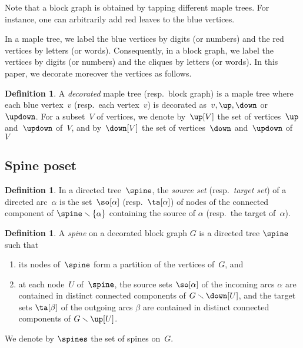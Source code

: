 \documentclass{amsart}
\theoremstyle{definition}
\newtheorem{definition}[theorem]{Definition}
\newcommand{\ssm}{\smallsetminus} %
\newcommand{\darkblue}{\color{darkblue}} %
\newcommand{\defn}[1]{\textsl{\darkblue #1}} %
\begin{document}
Note that a block graph is obtained by tapping different maple trees. For instance, one can arbitrarily add red leaves to the blue vertices.

In a maple tree, we label the blue vertices by digits (or numbers) and the red vertices by letters (or words).
Consequently, in a block graph, we label the vertices by digits (or numbers) and the cliques by letters (or words).
In this paper, we decorate moreover the vertices as follows.

\begin{definition}
  A \defn{decorated} maple tree (resp.~block graph) is a maple tree where each blue vertex~$v$ (resp.~each vertex~$v$) is decorated as~$v, \up, \down$ or~$\updown$.
  For a subset~$V$ of vertices, we denote by~$\up[V]$ the set of vertices~$\up$ and~$\updown$ of~$V$, and by~$\down[V]$ the set of vertices~$\down$ and~$\updown$ of~$V$
\end{definition}


\subsection{Spine poset}

\begin{definition}
  In a directed tree~$\spine$, the \defn{source set} (resp.~\defn{target set}) of a directed arc~$\alpha$ is the set~$\so[\alpha]$ (resp.~$\ta[\alpha]$) of nodes of the connected component of $\spine \ssm \{\alpha\}$ containing the source of $\alpha$ (resp.~the target of~$\alpha$).
\end{definition}

\begin{definition}
  \label{def:spine}
  A \defn{spine} on a decorated block graph $G$ is a directed tree $\spine$ such that
  \begin{enumerate}
    \item its nodes of~$\spine$ form a partition of the vertices of~$G$, and 
    \item at each node~$U$ of~$\spine$, the source sets $\so[\alpha]$ of the incoming arcs $\alpha$ are contained in distinct connected components of $G \ssm \down[U]$, and the target sets $\ta[\beta]$ of the outgoing arcs $\beta$ are contained in distinct connected components of $G \ssm \up[U]$.
  \end{enumerate}
  We denote by $\spines$ the set of spines on~$G$.
\end{definition}
\end{document}
